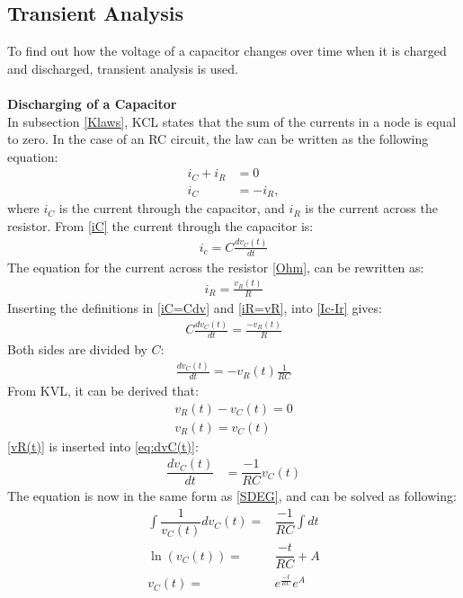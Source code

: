 \subsection{Transient Analysis}
\label{sec371}
To find out how the voltage of a capacitor changes over time when it is charged and discharged, transient analysis is used.
\\
\\
\textbf{Discharging of a Capacitor}\\
In subsection \ref{Klaws}, KCL states that the sum of the currents in a node is equal to zero. In the case of an RC circuit, the law can be written as the following equation:
\begin{align}
i_{C}+i_{R}&=0 \nonumber \\
i_{C}&= -i_{R}, \label{Ic-Ir}
\end{align}
where $i_C$ is the current through the capacitor, and $i_R$ is the current across the resistor. From \eqref{iC} the current through the capacitor is:
\begin{align}
	i_c = C\frac{dv_C(t)}{dt}\label{iC=Cdv}
\end{align}
The equation for the current across the resistor \eqref{Ohm}, can be rewritten as:
\begin{align}
	i_R = \frac{v_R(t)}{R}\label{iR=vR}
\end{align}
Inserting the definitions in \eqref{iC=Cdv} and \eqref{iR=vR}, into \eqref{Ic-Ir} gives:
\begin{align*}
	C\frac{dv_C(t)}{dt} = \frac{-v_R(t)}{R}
\end{align*}
Both sides are divided by $C$:
\begin{align}
	\frac{dv_C(t)}{dt} =-v_R(t) \frac{1}{RC}
	\label{eq:dvC(t)}
\end{align}
From KVL, it can be derived that:
\begin{align}
	v_R(t) - v_C(t) = 0\nonumber\\
	v_R(t) = v_C(t) \label{vR(t)}
\end{align}
\eqref{vR(t)} is inserted into \eqref{eq:dvC(t)}:
\begin{align*}
	\dfrac{dv_C(t)}{dt} &= \dfrac{-1}{RC}v_C(t)
\end{align*}
The equation is now in the same form as \eqref{SDEG}, and can be solved as following:
\begin{align}
\int \dfrac{1}{v_C(t)}dv_C(t) =& \dfrac{-1}{RC} \int dt\nonumber \\
\ln(v_C(t)) =& \dfrac{-t}{RC} + A \nonumber\\
v_C(t) =& e^{\frac{-t}{RC}}e^{A}\label{V_eA}
\end{align}
